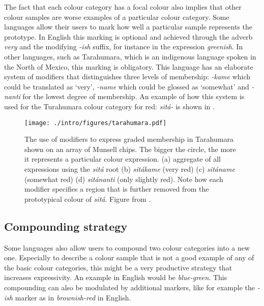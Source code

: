 The fact that each colour category has a focal colour also
implies that other colour samples are worse examples of a particular
colour category. Some languages allow their users to mark how well a
particular sample represents the prototype. In English this marking is
optional and achieved through the adverb \textit{very} and the modifying
\textit{-ish} suffix, for instance in the expression \textit{greenish}. In other
languages, such as Tarahumara, which is an indigenous language spoken
in the North of Mexico, this marking is obligatory. This language has
an elaborate system of modifiers that distinguishes three levels of
membership: \textit{-kame} which could be translated as `very', \textit{-name}
which could be glossed as `somewhat' and \textit{-nanti} for the lowest
degree of membership. An example of how this system is used for the
Turahumara colour category for red: \textit{sit\'a-} is shown in  \citep{burgress83tarahumara}.

\begin{figure}[htbp]
  \begin{center}
   \texttt{[image: ./intro/figures/tarahumara.pdf]}
   \caption[The use of modifiers in Tarahumara]{The use of modifiers
     to express graded membership in Tarahumara shown on an array of
     Munsell chips. The bigger the circle, the more it represents a
     particular colour expression. (a) aggregate of all expressions
     using the \textit{sit\'a} root (b) \textit{sit\'akame} (very red) (c)
     \textit{sit\'aname} (somewhat red) (d) \textit{sit\'ananti} (only slightly
     red). Note how each modifier specifies a region that is further
     removed from the prototypical colour of \textit{sit\'a}. Figure from
     \cite{burgress83tarahumara}.}
    \label{f:tarahumara}
  \end{center}
\end{figure}

\subsection{Compounding strategy}

Some languages also allow users to compound two colour categories into
a new one. Especially to describe a colour sample that is not a good
example of any of the basic colour categories, this might be a very
productive strategy that increases expressivity. An example in English
would be \textit{blue-green}. This compounding can also be modulated by
additional markers, like for example the \mbox{\textit{-ish}} marker as in
\textit{brownish-red} in English.

